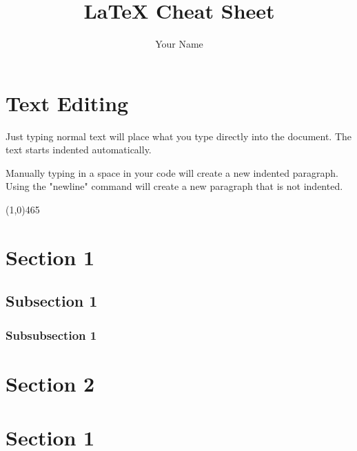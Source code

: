 \documentclass[12pt]{article}
\newenvironment{tightcenter}{%
  \setlength\topsep{0pt}
  \setlength\parskip{0pt}
  \begin{center}
}{%
  \end{center}
}
\begin{document}
 

\title{\LaTeX \text{} Cheat Sheet}
\author{Your Name} 

\maketitle



\section*{Text Editing}

Just typing normal text will place what you type directly into the document. The text starts indented automatically. 

Manually typing in a space in your code will create a new indented paragraph. 
\newline
Using the "newline" command will create a new paragraph that is not indented.

\begin{tightcenter}
\line(1,0){465}
\end{tightcenter}

\section{Section 1}
\subsection{Subsection 1}
\subsubsection{Subsubsection 1}
\section{Section 2}

\section*{Section 1}
\end{document}
